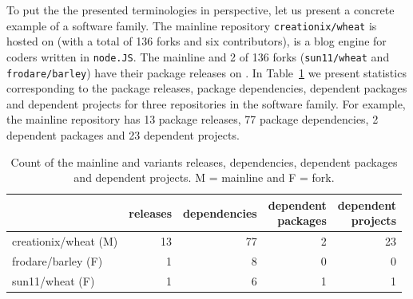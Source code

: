 To put the the presented terminologies in perspective, let us present a concrete example of a software family. 
The mainline repository \texttt{creationix/wheat} is hosted on \gh (with a total of 136 forks and six contributors), is a blog engine for coders written in \texttt{node.JS}. 
The mainline and 2 of 136 forks (\texttt{sun11/wheat} and \texttt{frodare/barley}) have their package releases on \npm. 
In Table~\ref{tab:example} we present statistics corresponding to the package releases, package dependencies, dependent packages and dependent projects for three repositories in the software family.
For example, the mainline repository has 13 package releases, 77 package dependencies, 2 dependent packages and 23 dependent projects.

\begin{table}[ht]
\begin{center}
\caption{Count of the mainline and variants releases, dependencies, dependent packages and dependent projects. M = mainline and F = fork.}
\label{tab:example}
\begin{tabular}{l r r r r } 
 \hline
 &releases & dependencies & \shortstack{dependent \\ packages} & \shortstack{dependent \\ projects} \\ \hline
 creationix/wheat (M)  &13 & 77 & 2&23 \\ 
 frodare/barley (F)    &1 & 8 & 0 & 0 \\ 
 sun11/wheat (F)       &1 & 6 & 1 & 1 \\ 
 \hline
\end{tabular}
\end{center}
\end{table}

